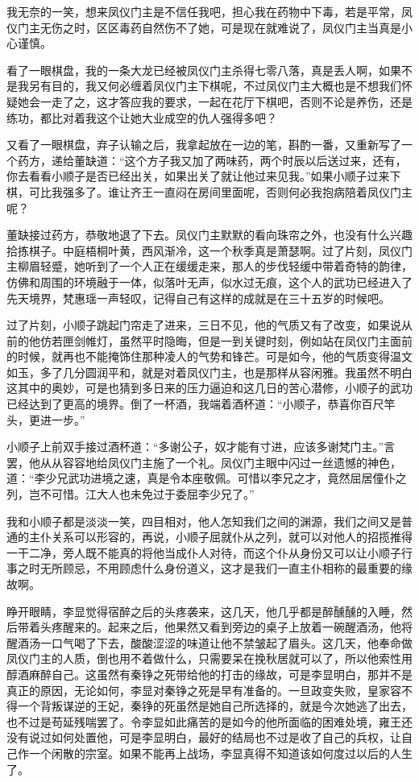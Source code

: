 我无奈的一笑，想来凤仪门主是不信任我吧，担心我在药物中下毒，若是平常，凤仪门主无伤之时，区区毒药自然伤不了她，可是现在就难说了，凤仪门主当真是小心谨慎。

看了一眼棋盘，我的一条大龙已经被凤仪门主杀得七零八落，真是丢人啊，如果不是我另有目的，我又何必缠着凤仪门主下棋呢，不过凤仪门主大概也是不想我们怀疑她会一走了之，这才答应我的要求，一起在花厅下棋吧，否则不论是养伤，还是练功，都比对着我这个让她大业成空的仇人强得多吧？

又看了一眼棋盘，弃子认输之后，我拿起放在一边的笔，斟酌一番，又重新写了一个药方，递给董缺道：“这个方子我又加了两味药，两个时辰以后送过来，还有，你去看看小顺子是否已经出关，如果出关了就让他过来见我。”如果小顺子过来下棋，可比我强多了。谁让齐王一直闷在房间里面呢，否则何必我抱病陪着凤仪门主呢？

董缺接过药方，恭敬地退了下去。凤仪门主默默的看向珠帘之外，也没有什么兴趣拾拣棋子。中庭梧桐叶黄，西风渐冷，这一个秋季真是萧瑟啊。过了片刻，凤仪门主柳眉轻蹙，她听到了一个人正在缓缓走来，那人的步伐轻缓中带着奇特的韵律，仿佛和周围的环境融于一体，似落叶无声，似水过无痕，这个人的武功已经进入了先天境界，梵惠瑶一声轻叹，记得自己有这样的成就是在三十五岁的时候吧。

过了片刻，小顺子跳起门帘走了进来，三日不见，他的气质又有了改变，如果说从前的他仿若匣剑帷灯，虽然平时隐晦，但是一到关键时刻，例如站在凤仪门主面前的时候，就再也不能掩饰住那种凌人的气势和锋芒。可是如今，他的气质变得温文如玉，多了几分圆润平和，就是对着凤仪门主，也是那样从容闲雅。我虽然不明白这其中的奥妙，可是也猜到多日来的压力逼迫和这几日的苦心潜修，小顺子的武功已经达到了更高的境界。倒了一杯酒，我端着酒杯道：“小顺子，恭喜你百尺竿头，更进一步。”

小顺子上前双手接过酒杯道：“多谢公子，奴才能有寸进，应该多谢梵门主。”言罢，他从从容容地给凤仪门主施了一个礼。凤仪门主眼中闪过一丝遗憾的神色，道：“李少兄武功进境之速，真是令本座敬佩。可惜以李兄之才，竟然屈居僮仆之列，岂不可惜。江大人也未免过于委屈李少兄了。”

我和小顺子都是淡淡一笑，四目相对，他人怎知我们之间的渊源，我们之间又是普通的主仆关系可以形容的，再说，小顺子屈就仆从之列，就可以对他人的招揽推得一干二净，旁人既不能真的将他当成仆人对待，而这个仆从身份又可以让小顺子行事之时无所顾忌，不用顾虑什么身份道义，这才是我们一直主仆相称的最重要的缘故啊。

睁开眼睛，李显觉得宿醉之后的头疼袭来，这几天，他几乎都是醉醺醺的入睡，然后带着头疼醒来的。起来之后，他果然又看到旁边的桌子上放着一碗醒酒汤，他将醒酒汤一口气喝了下去，酸酸涩涩的味道让他不禁皱起了眉头。这几天，他奉命做凤仪门主的人质，倒也用不着做什么，只需要呆在挽秋居就可以了，所以他索性用醇酒麻醉自己。这虽然有秦铮之死带给他的打击的缘故，可是李显明白，那并不是真正的原因，无论如何，李显对秦铮之死是早有准备的。一旦政变失败，皇家容不得一个背叛谋逆的王妃，秦铮的死虽然是她自己所选择的，就是今次她逃了出去，也不过是苟延残喘罢了。令李显如此痛苦的是如今的他所面临的困难处境，雍王还没有说过如何处置他，可是李显明白，最好的结局也不过是收了自己的兵权，让自己作一个闲散的宗室。如果不能再上战场，李显真得不知道该如何度过以后的人生了。

